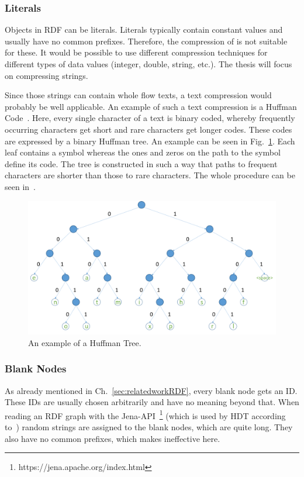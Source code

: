 \subsubsection{Literals}\label{sec:approachLiterals}

Objects in RDF can be literals. Literals typically contain constant values and usually have no common prefixes. Therefore, the compression of \DHDT{} is not suitable for these. It would be possible to use different compression techniques for different types of data values (integer, double, string, etc.). The thesis will focus on compressing strings.

Since those strings can contain whole flow texts, a text compression would probably be well applicable. An example of such a text compression is a Huffman Code~\cite{huffman}. Here, every single character of a text is binary coded, whereby frequently occurring characters get short and rare characters get longer codes. These codes are expressed by a binary Huffman tree. An example can be seen in Fig.~\ref{fig:huffmantree}. Each leaf contains a symbol whereas the ones and zeros on the path to the symbol define its code. The tree is constructed in such a way that paths to frequent characters are shorter than those to rare characters. The whole procedure can be seen in~\cite{huffman}.

\begin{figure}
	\centering
	\includegraphics[width=0.9\linewidth]{figures/4_rdf_specific_features/huffman}
	\caption{An example of a Huffman Tree.}
	\label{fig:huffmantree}
\end{figure}

\subsubsection{Blank Nodes}\label{sec:approachBlankNodes}

As already mentioned in Ch.~\ref{sec:relatedworkRDF}, every blank node gets an ID. These IDs are usually chosen arbitrarily and have no meaning beyond that. When reading an RDF graph with the Jena-API~\footnote{\label{foot:5}https://jena.apache.org/index.html} (which is used by HDT according to~\cite{hdt}) random strings are assigned to the blank nodes, which are quite long. They also have no common prefixes, which makes \DHDT{} ineffective here. 

